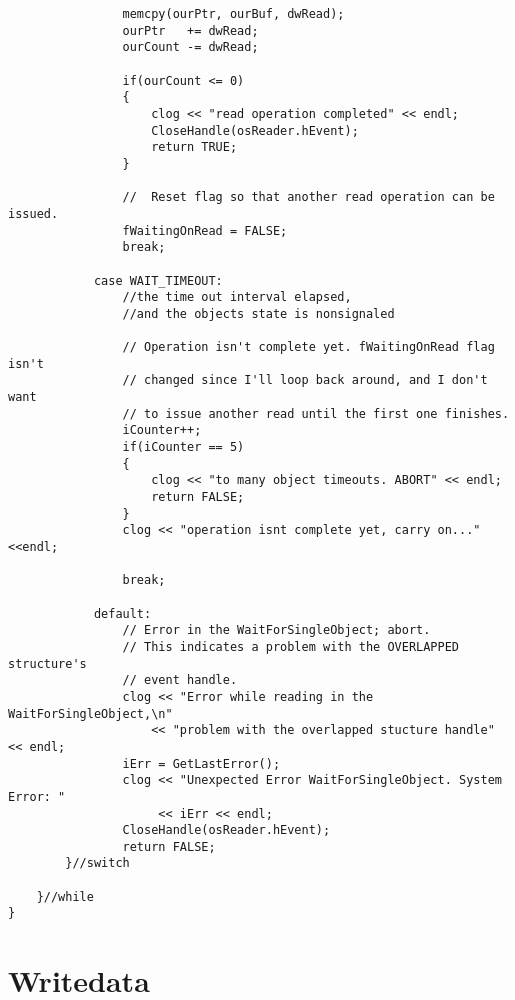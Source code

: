 \begin{lstlisting}
				memcpy(ourPtr, ourBuf, dwRead);
				ourPtr   += dwRead;
				ourCount -= dwRead;
					
				if(ourCount <= 0) 
				{
					clog << "read operation completed" << endl;
					CloseHandle(osReader.hEvent);
					return TRUE;
				}

				//  Reset flag so that another read operation can be issued.
				fWaitingOnRead = FALSE;
				break;

			case WAIT_TIMEOUT:
				//the time out interval elapsed,
				//and the objects state is nonsignaled

				// Operation isn't complete yet. fWaitingOnRead flag isn't
				// changed since I'll loop back around, and I don't want
				// to issue another read until the first one finishes.
				iCounter++;
				if(iCounter == 5)
				{
					clog << "to many object timeouts. ABORT" << endl;
					return FALSE;
				}
				clog << "operation isnt complete yet, carry on..."<<endl;

				break;                       

			default:
				// Error in the WaitForSingleObject; abort.
				// This indicates a problem with the OVERLAPPED structure's
				// event handle.
				clog << "Error while reading in the WaitForSingleObject,\n"
					<< "problem with the overlapped stucture handle" << endl;
				iErr = GetLastError();
				clog << "Unexpected Error WaitForSingleObject. System Error: "
				     << iErr << endl;
				CloseHandle(osReader.hEvent);
				return FALSE;
		}//switch

	}//while
}
\end{lstlisting}



\newpage
\section{Writedata}\label{WriteDataCode}

